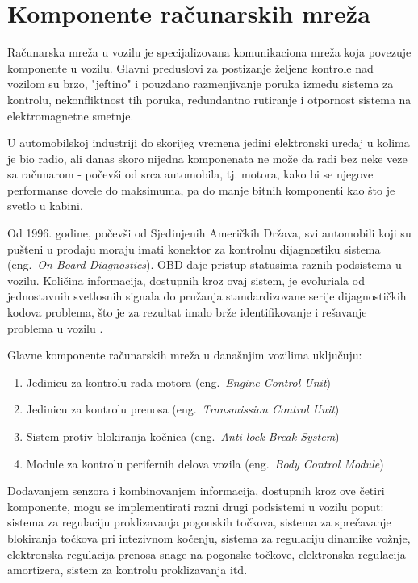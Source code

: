 \documentclass[a4paper]{article}
\begin{document}
\section{Komponente računarskih mreža}
\label{sec:komponente}

Računarska mreža u vozilu je specijalizovana komunikaciona mreža koja povezuje komponente u vozilu. Glavni preduslovi za postizanje željene kontrole nad vozilom su brzo, "jeftino" i pouzdano razmenjivanje poruka između sistema za kontrolu, nekonfliktnost tih poruka, redundantno rutiranje i otpornost sistema na elektromagnetne smetnje.

U automobilskoj industriji do skorijeg vremena jedini elektronski uređaj u kolima je bio radio, ali danas skoro nijedna komponenata ne može da radi bez neke veze sa računarom - počevši od srca automobila, tj. motora, kako bi se njegove performanse dovele do maksimuma, pa do manje bitnih komponenti kao što je svetlo u kabini.

Od 1996. godine, počevši od Sjedinjenih Američkih Država, svi automobili koji su pušteni u  prodaju moraju imati konektor za kontrolnu dijagnostiku sistema (eng.~{\em On-Board Diagnostics}). OBD daje pristup statusima raznih podsistema u vozilu. Količina informacija, dostupnih kroz ovaj sistem\cite{OBD}, je evoluriala od jednostavnih svetlosnih signala do pružanja standardizovane serije dijagnostičkih kodova problema, što je za rezultat imalo brže identifikovanje i rešavanje problema u vozilu \cite{VB}. 

Glavne komponente računarskih mreža u današnjim vozilima uključuju: 
\begin{enumerate}
	\item Jedinicu za kontrolu rada motora (eng.~{\em Engine Control Unit})\cite{ECU} 
	\item Jedinicu za kontrolu prenosa (eng.~{\em Transmission Control Unit})\cite{TCU} 
	\item Sistem protiv blokiranja kočnica (eng.~{\em Anti-lock Break System})\cite{ABS}
	\item Module za kontrolu perifernih delova vozila (eng.~{\em Body Control Module})\cite{BCM}
\end{enumerate}

Dodavanjem senzora i kombinovanjem informacija, dostupnih kroz ove četiri komponente, mogu se implementirati razni drugi podsistemi u vozilu poput: sistema za regulaciju proklizavanja pogonskih točkova, sistema za sprečavanje blokiranja točkova pri intezivnom kočenju,  sistema za regulaciju dinamike vožnje, elektronska regulacija prenosa snage na pogonske točkove, elektronska regulacija amortizera, sistem za kontrolu proklizavanja itd.
\end{document}
